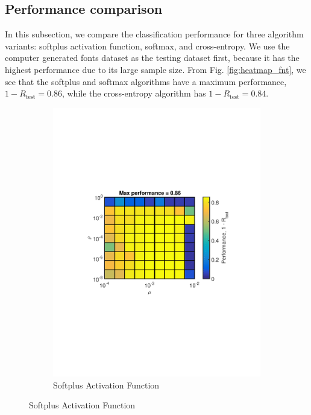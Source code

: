 \documentclass[journal,a4paper,onecolumn,11pt]{IEEEtran}
\begin{document}
\subsection{Performance comparison}
In this subsection, we compare the classification performance for three algorithm variants: softplus activation function, softmax, and cross-entropy. We use the computer generated fonts dataset as the testing dataset first, because it has the highest performance due to its large sample size. From Fig. \ref{fig:heatmap_fnt}, we see that the softplus and softmax algorithms have a maximum performance, $1-R_\text{test}=0.86$, while the cross-entropy algorithm has $1-R_\text{test}=0.84$.
\begin{figure}[!h] 
	\centering
	\begin{subfigure}{.5\textwidth}
		\centering
		\includegraphics[clip, trim=0cm .25cm 0cm .25cm, width=\textwidth]{Opt_sp_fnt_2600.pdf}
		\caption{Softplus Activation Function}
		\label{fig:Opt_sp_fnt_2600}
	\end{subfigure}%

\end{figure}
\end{document}
